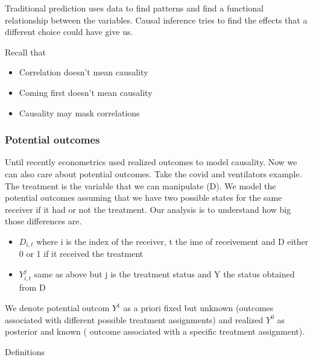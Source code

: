 \vspace{10pt}

Traditional prediction uses data to find patterns and find a functional relationship between the variables. Causal inference tries to find the effects that a different choice could have give us. 

Recall that 

\begin{itemize}
    \item Correlation doesn't mean causality
    \item Coming first doesn't mean causality
    \item Causality may mask correlations
\end{itemize}

\subsubsection{Potential outcomes}

Until recently econometrics used realized outcomes to model causality. Now we can also care about potential outcomes. Take the covid and ventilators example. The treatment is the variable that we can manipulate (D). We model the potential outcomes assuming that we have two possible states for the same receiver if it had or not the treatment. Our analysis is to understand how big those differences are. 

\begin{itemize}
    \item $D_{i,t}$ \ra where i is the index of the receiver, t the ime of receivement and D either 0 or 1 if it received the treatment
    \item $Y^j_{i, t}$ \ra same as above but j is the treatment status and Y the status obtained from D
\end{itemize}

We denote potential outcom $Y^1$ as a priori fixed but unknown (outcomes associated with
different possible treatment assignments) and realized $Y^0$ as posterior and known ( outcome associated with a specific treatment assignment). 

\vspace{10pt}

Definitions

